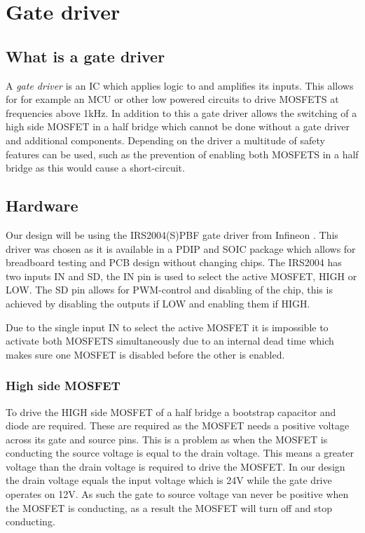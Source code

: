 \section{Gate driver} \label{section:gatedriver}

\subsection{What is a gate driver}
A \textit{gate driver} is an IC which applies logic to and amplifies its inputs. This allows for for example an MCU or other low powered circuits to drive MOSFETS at frequencies above 1kHz. In addition to this a gate driver allows the switching of a high side MOSFET in a half bridge which cannot be done without a gate driver and additional components. Depending on the driver a multitude of safety features can be used, such as the prevention of enabling both MOSFETS in a half bridge as this would cause a short-circuit.

\subsection{Hardware}
Our design will be using the IRS2004(S)PBF gate driver from Infineon \cite{IRS2004PBF_Datasheet}. This driver was chosen as it is available in a PDIP and SOIC package which allows for breadboard testing and PCB design without changing chips. The IRS2004 has two inputs IN and SD, the IN pin is used to select the active MOSFET, HIGH or LOW. The SD pin allows for PWM-control and disabling of the chip, this is achieved by disabling the outputs if LOW and enabling them if HIGH.

Due to the single input IN to select the active MOSFET it is impossible to activate both MOSFETS simultaneously due to an internal dead time which makes sure one MOSFET is disabled before the other is enabled.

\subsubsection{High side MOSFET}
To drive the HIGH side MOSFET of a half bridge a bootstrap capacitor and diode are required. These are required as the MOSFET needs a positive voltage across its gate and source pins. This is a problem as when the MOSFET is conducting the source voltage is equal to the drain voltage. This means a greater voltage than the drain voltage is required to drive the MOSFET. In our design the drain voltage equals the input voltage which is 24V while the gate drive operates on 12V. As such the gate to source voltage van never be positive when the MOSFET is conducting, as a result the MOSFET will turn off and stop conducting.

